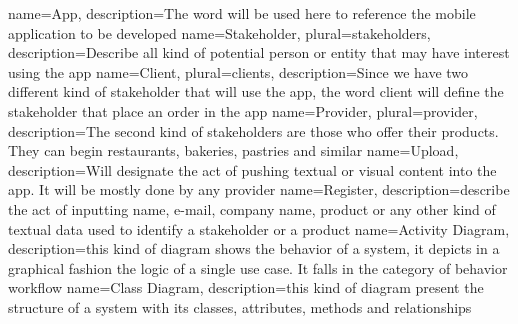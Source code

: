 
\makeglossaries


 {
    name={App},
    description={The word will be used here to reference the mobile application to be developed}
}
 {
    name={Stakeholder},
    plural={stakeholders},
    description={Describe all kind of potential person or entity that may have interest using the app}
}
 {
    name={Client},
    plural={clients},
    description={Since we have two different kind of stakeholder that will use the app, the word
                 client will define the stakeholder that place an order in the app}
}
 {
    name={Provider},
    plural={provider},
    description={The second kind of stakeholders are those who offer their products. They can begin
                restaurants, bakeries, pastries and similar}
}
 {
    name={Upload},
    description={Will designate the act of pushing textual or visual content into the app. It will
                be mostly done by any provider}
}
 {
    name={Register},
    description={describe the act of inputting name, e-mail, company name, product or any other kind of
    textual data used to identify a stakeholder or a product}
}
 {
    name={Activity Diagram},
    description={this kind of diagram shows the behavior of a system, it depicts in a graphical fashion 
    the logic of a single use case. It falls in the category of behavior workflow \cite{refinbook:Baresi2009}}
}
 {
    name={Class Diagram},
    description={this kind of diagram present the structure of a system with its classes, attributes,
    methods and relationships\cite{refonline:IBMCD}}
}







    
    \tableofcontents
    \newpage
    \clearpage
    \printglossary[type=acronym,title=Abbreviations,toctitle=Abbreviations]
    \clearpage
    \newpage
    \clearpage
    \printglossary[title=Glossary,toctitle=Glossary]
    \clearpage
    
    
    \nocite{*}
    
    
        
